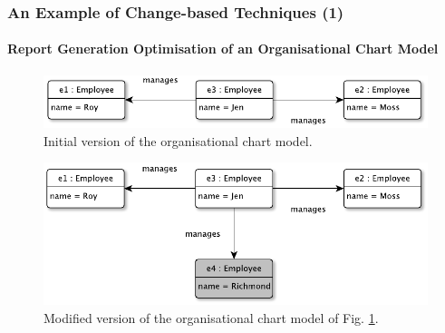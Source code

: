 \documentclass{beamer}
\begin{document}
\begin{frame}
\frametitle{An Example of Change-based Techniques (1)}
\label{sec:An example_of_change-based_techniques_1}
\framesubtitle{Report Generation Optimisation of an Organisational Chart Model}
\begin{figure}[ht]
\centering
\includegraphics[width=\linewidth]{initial_chart}
\caption{Initial version of the organisational chart model.}
\label{fig:initial_chart}
\end{figure}

\begin{figure}[ht]
\centering
\includegraphics[width=\linewidth]{modified_chart}
\caption{Modified version of the organisational chart model of Fig. \ref{fig:initial_chart}.}
\label{fig:modified_chart}
\end{figure}
\end{frame}
\end{document}
